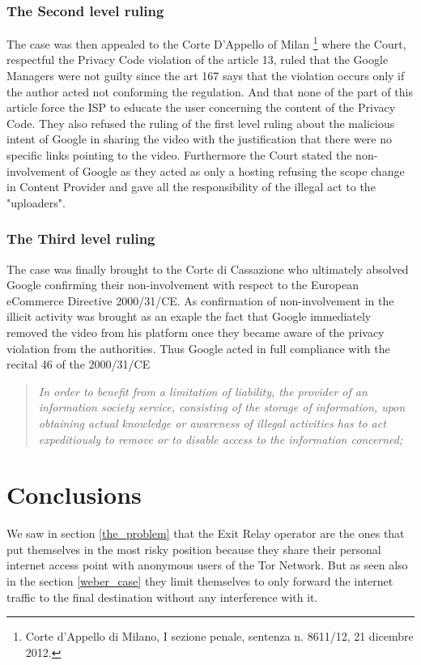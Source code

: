 \documentclass[runningheads,a4paper]{llncs}
\begin{document}
\subsubsection{The Second level ruling}
The case was then appealed to the Corte D'Appello of Milan
\footnote{
Corte d’Appello di Milano, I sezione penale, sentenza n. 8611/12, 21 dicembre 2012.
} where the Court, respectful the Privacy Code violation of the article 13, ruled that the Google Managers were not guilty since the art 167 says that the violation occurs only if the author acted not conforming the regulation. And that none of the part of this article force the ISP to educate the user concerning the content of the Privacy Code. \cite{NOTARI}
They also refused the ruling of the first level ruling about the malicious intent of Google in sharing the video with the justification that there were no specific links pointing to the video. Furthermore the Court stated the non-involvement of Google as they acted as only a hosting refusing the scope change in Content Provider and gave all the responsibility of the illegal act to the "uploaders". 

\subsubsection{The Third level ruling}
The case was finally brought to the Corte di Cassazione who ultimately absolved Google confirming their non-involvement with respect to the European eCommerce Directive 2000/31/CE. As confirmation of non-involvement in the illicit activity was brought as an exaple the fact that Google immediately removed the video from his platform once they became aware of the privacy violation from the authorities. Thus Google acted in full compliance with the recital 46 of the 2000/31/CE \begin{quote}
    \textit{
    In order to benefit from a limitation of liability, the provider of an information society service, consisting of the storage of information, upon obtaining actual knowledge or awareness of illegal activities has to act expeditiously to remove or to disable access to the information concerned; 
    }
\end{quote}



\section{Conclusions}


We saw in section \ref{the_problem} that the Exit Relay operator are the ones that put themselves in the most risky position because they share their personal internet access point with anonymous users of the Tor Network. But as seen also in the section \ref{weber_case} they limit themselves to only forward the internet traffic to the final destination without any interference with it.
\end{document}
